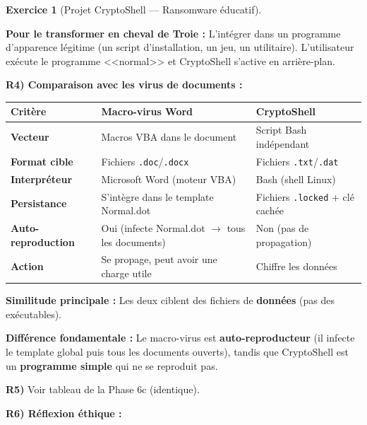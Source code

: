 \documentclass[a4paper,11pt]{article}
\theoremstyle{plain}
\theoremstyle{definition}
\newtheorem{exercice}{Exercice}
\begin{document}
\begin{exercice}[Projet CryptoShell --- Ransomware éducatif]
\begin{correction}
\textbf{Pour le transformer en cheval de Troie :} L'intégrer dans un programme d'apparence légitime (un script d'installation, un jeu, un utilitaire). L'utilisateur exécute le programme <<normal>> et CryptoShell s'active en arrière-plan.

\medskip
\textbf{R4) Comparaison avec les virus de documents :}

\begin{center}
\begin{tabular}{lp{4.5cm}p{4.5cm}}
\toprule
\textbf{Critère} & \textbf{Macro-virus Word} & \textbf{CryptoShell} \\
\midrule
\textbf{Vecteur} & Macros VBA dans le document & Script Bash indépendant \\
\textbf{Format cible} & Fichiers \texttt{.doc}/\texttt{.docx} & Fichiers \texttt{.txt}/\texttt{.dat} \\
\textbf{Interpréteur} & Microsoft Word (moteur VBA) & Bash (shell Linux) \\
\textbf{Persistance} & S'intègre dans le template Normal.dot & Fichiers \texttt{.locked} + clé cachée \\
\textbf{Auto-reproduction} & Oui (infecte Normal.dot $\to$ tous les documents) & Non (pas de propagation) \\
\textbf{Action} & Se propage, peut avoir une charge utile & Chiffre les données \\
\bottomrule
\end{tabular}
\end{center}

\textbf{Similitude principale :} Les deux ciblent des fichiers de \textbf{données} (pas des exécutables).

\textbf{Différence fondamentale :} Le macro-virus est \textbf{auto-reproducteur} (il infecte le template global puis tous les documents ouverts), tandis que CryptoShell est un \textbf{programme simple} qui ne se reproduit pas.

\medskip
\textbf{R5)} Voir tableau de la Phase 6c (identique).

\medskip
\textbf{R6) Réflexion éthique :}


\end{correction}
\end{exercice}
\end{document}
